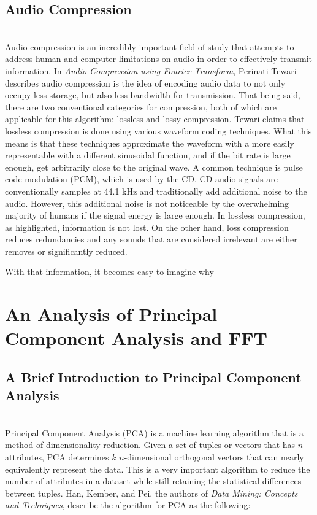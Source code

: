 \documentclass{amsproc}
\begin{document}
\subsection{Audio Compression}

\mbox{}	 \\
\indent Audio compression is an incredibly important field of study that attempts to address human and computer limitations on audio in order to effectively transmit information. In \textit{Audio Compression using Fourier Transform}, Perinati Tewari describes audio compression is the idea of encoding audio data to not only occupy less storage, but also less bandwidth for transmission. That being said, there are two conventional categories for compression, both of which are applicable for this algorithm: lossless and lossy compression. Tewari claims that lossless compression is done using various waveform coding techniques. What this means is that these techniques approximate the waveform with a more easily representable with a different sinusoidal function, and if the bit rate is large enough, get arbitrarily close to the original wave. A common technique is pulse code modulation (PCM), which is used by the CD. CD audio signals are conventionally samples at 44.1 kHz and traditionally add additional noise to the audio. However, this additional noise is not noticeable by the overwhelming majority of humans if the signal energy is large enough. In lossless compression, as highlighted, information is not lost. On the other hand, loss compression reduces redundancies  and any sounds that are considered irrelevant are either removes or significantly reduced.

With that information, it becomes easy to imagine why 

\section{An Analysis of Principal Component Analysis and FFT}

\subsection{A Brief Introduction to Principal Component Analysis}

\mbox{}	 \\
\indent Principal Component Analysis (PCA) is a machine learning algorithm that is a method of dimensionality reduction. Given a set of tuples or vectors that has $n$ attributes, PCA determines $k$ $n$-dimensional orthogonal vectors that can nearly equivalently represent the data. This is a very important algorithm to reduce the number of attributes in a dataset while still retaining the statistical differences between tuples. Han, Kember, and Pei, the authors of \textit{Data Mining: Concepts and Techniques}, describe the algorithm for PCA as the following:
\end{document}

